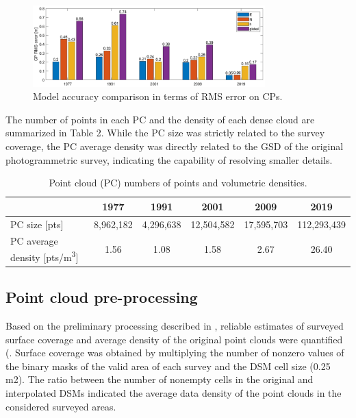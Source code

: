 {\begin{figure}
    \centering
    \includegraphics[width=0.8\textwidth]{cp_error.png}
    \caption{Model accuracy comparison in terms of RMS error on CPs. }
    \label{fig:2:cp_error}
\end{figure}

The number of points in each PC and the density of each dense cloud are summarized in Table 2.
While the PC size was strictly related to the survey coverage, the PC average density was directly related to the GSD of the original photogrammetric survey, indicating the capability of resolving smaller details.

\begin{table}
    \centering
    \caption{Point cloud (PC) numbers of points and volumetric densities.}
    \label{tab:2:pcd_density}
    \begin{tabular}{lccccc}
        \hline
        & 1977 & 1991 & 2001 & 2009 & 2019 \\
        \hline
        PC size [pts] & 8,962,182 & 4,296,638 & 12,504,582 & 17,595,703 & 112,293,439 \\
        PC average density [pts/m\textsuperscript{3}] & 1.56 & 1.08 & 1.58 & 2.67 & 26.40 \\
        \hline
    \end{tabular}
\end{table}


\subsection{Point cloud pre-processing}\label{sec:2:res_preproc}

Based on the preliminary processing described in , reliable estimates of surveyed surface coverage and average density of the original point clouds were quantified (.
Surface coverage was obtained by multiplying the number of nonzero values of the binary masks of the valid area of each survey and the DSM cell size (0.25 m2). 
The ratio between the number of nonempty cells in the original and interpolated DSMs indicated the average data density of the point clouds in the considered surveyed areas. 

}
